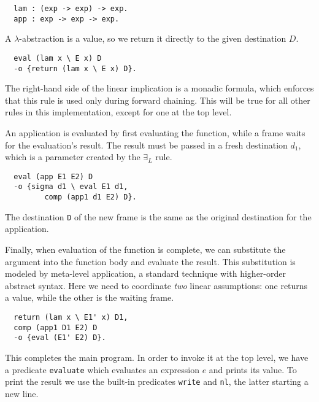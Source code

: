 \documentclass{sig-alt}
\begin{document}
\begin{small}\begin{verbatim}
  lam : (exp -> exp) -> exp.
  app : exp -> exp -> exp.
\end{verbatim}\end{small}

A $\lambda$-abstraction is a value, so we return it directly
to the given destination $D$.

\begin{small}\begin{verbatim}
  eval (lam x \ E x) D
  -o {return (lam x \ E x) D}. 
\end{verbatim}\end{small}
\noindent The right-hand side of the linear implication is a monadic formula,
which enforces that this rule is used only during forward chaining.
This will be true for all other rules in this implementation,
except for one at the top level.

An application is evaluated by first evaluating the function,
while a frame waits for the evaluation's result.
The result must be passed in a fresh destination $d_1$, which is
a parameter created by the $\exists_L$ rule.

\begin{small}\begin{verbatim}
  eval (app E1 E2) D
  -o {sigma d1 \ eval E1 d1,
         comp (app1 d1 E2) D}.
\end{verbatim}\end{small}
\noindent
The destination \verb"D" of the new frame is the same as the original
destination for the application.

Finally, when evaluation of the function is complete, we can
substitute the argument into the function body and evaluate
the result.  This substitution is modeled by meta-level application,
a standard technique with higher-order abstract syntax.
Here we need to coordinate \emph{two} linear
assumptions: one returns a value, while the other is the waiting
frame.

\begin{small}\begin{verbatim}
  return (lam x \ E1' x) D1,
  comp (app1 D1 E2) D
  -o {eval (E1' E2) D}.
\end{verbatim}\end{small}

This completes the main program.  In order to invoke it
at the top level, we have a predicate \verb"evaluate"
which evaluates an expression $e$ and prints its value.
To print the result we use the built-in predicates \verb"write"
and \verb"nl", the latter starting a new line.
\end{document}
